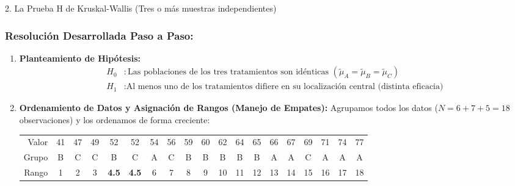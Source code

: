 \documentclass[11pt,a4paper]{article}
\begin{document}
\begin{subsection}{2. La Prueba H de Kruskal-Wallis (Tres o más muestras independientes)}
    \subsubsection*{Resolución Desarrollada Paso a Paso:}
    \begin{enumerate}
        \item \textbf{Planteamiento de Hipótesis:}
              \begin{align*}
                  H_0&: \text{Las poblaciones de los tres tratamientos son idénticas } (\tilde{\mu}_A = \tilde{\mu}_B = \tilde{\mu}_C) \\
                  H_1&: \text{Al menos uno de los tratamientos difiere en su localización central (distinta eficacia)}
              \end{align*}
        \item \textbf{Ordenamiento de Datos y Asignación de Rangos (Manejo de Empates):}
              Agrupamos todos los datos ($N = 6 + 7 + 5 = 18$ observaciones) y los ordenamos de forma creciente:
              \begin{table}[h!]
                  \centering
                  \begin{tabular}{rcccccccccccccccccc}
                      \toprule
                      Valor & 41 & 47 & 49 & 52 & 52 & 54 & 56 & 59 & 60 & 62 & 64 & 65 & 66 & 67 & 69 & 71 & 74 & 77 \\
                      Grupo & B & C & C & B & C & A & C & B & B & B & B & B & A & A & C & A & A & A \\
                      \midrule
                      Rango & 1 & 2 & 3 & \textbf{4.5} & \textbf{4.5} & 6 & 7 & 8 & 9 & 10 & 11 & 12 & 13 & 14 & 15 & 16 & 17 & 18 \\
                      \bottomrule
                  \end{tabular}
              \end{table}
              

\end{enumerate}
\end{subsection}
\end{document}

